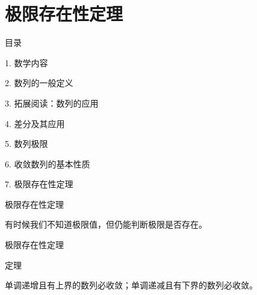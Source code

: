 \documentclass[aspectratio=169,10pt,fontset=fandol]{ctexbeamer}
\newenvironment{custom}[1]{\par\noindent\textbf{#1}\quad}{\par\vspace{0.8em}}
\begin{document}
\section{极限存在性定理}
\begin{frame}[t,fragile]{目录}
\normalsize
{\color{black}\normalsize 1. 数学内容\par}\vspace{0.3em}
{\color{black}\normalsize 2. 数列的一般定义\par}\vspace{0.3em}
{\color{black}\normalsize 3. 拓展阅读：数列的应用\par}\vspace{0.3em}
{\color{black}\normalsize 4. 差分及其应用\par}\vspace{0.3em}
{\color{black}\normalsize 5. 数列极限\par}\vspace{0.3em}
{\color{black}\normalsize 6. 收敛数列的基本性质\par}\vspace{0.3em}
{\color{blue}\normalsize 7. 极限存在性定理\par}\vspace{0.3em}
\end{frame}
\begin{frame}[t,fragile]{极限存在性定理}
\footnotesize
{\footnotesize
有时候我们不知道极限值，但仍能判断极限是否存在。


}
\end{frame}
\begin{frame}[t,fragile]{极限存在性定理}
\footnotesize
\begin{block}{定理}
{\footnotesize

单调递增且有上界的数列必收敛；单调递减且有下界的数列必收敛。

}
\end{block}
\end{frame}
\end{document}
